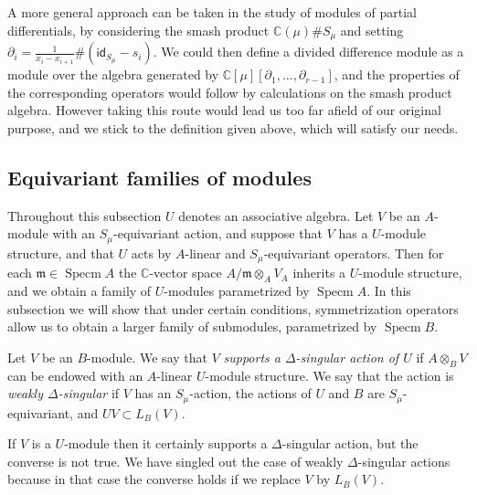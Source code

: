 \documentclass[11pt,fleqn]{article}
\newcounter{para}[section]
\newcommand\CC{\mathbb C}
\newcommand\ot{\otimes}
\newcommand\id{\mathsf{id}}
\newcommand\m{\mathfrak m}
\DeclareMathOperator\Specm{Specm}
\begin{document}
\begin{Remark}
A more general approach can be taken in the study of modules of partial 
differentials, by considering the smash product $\CC(\mu) \# S_\mu$ and 
setting $\partial_i = \frac{1}{x_i - x_{i+1}} \# (\id_{S_\mu} - s_i)$. We 
could then define a divided difference module as a module over 
the algebra generated by $\CC[\mu][\partial_1, \ldots, \partial_{r-1}]$, and 
the properties of the corresponding operators would follow by calculations on 
the smash product algebra. However taking this route would lead us too far 
afield of our original purpose, and we stick to the definition given above, 
which will satisfy our needs.
\end{Remark}

\subsection{Equivariant families of modules}
Throughout this subsection $U$ denotes an associative algebra. Let $V$ be an 
$A$-module with an $S_\mu$-equivariant action, and suppose that $V$ has a 
$U$-module structure, and that $U$ acts by $A$-linear and $S_\mu$-equivariant 
operators. Then for each $\m \in \Specm A$ the $\CC$-vector space $A/\m \ot_A 
V_A$ inherits a $U$-module structure, and we obtain a family of $U$-modules 
parametrized by $\Specm A$. In this subsection we will show that under certain 
conditions, symmetrization operators allow us to obtain a larger family of 
submodules, parametrized by $\Specm B$.

\begin{Definition}
Let $V$ be an $B$-module. We say that $V$ \emph{supports a $\Delta$-singular 
action of $U$} if $A \ot_B V$ can be endowed with an $A$-linear $U$-module 
structure. We say that the action is \emph{weakly $\Delta$-singular} if 
$V$ has an $S_\mu$-action, the actions of $U$ and $B$ are $S_\mu$-equivariant, 
and $U V \subset L_B(V)$.
\end{Definition}

If $V$ is a $U$-module then it certainly supports a $\Delta$-singular action,
but the converse is not true. We have singled out the case of weakly 
$\Delta$-singular actions because in that case the converse holds if we 
replace $V$ by $L_B(V)$.
\end{document}
